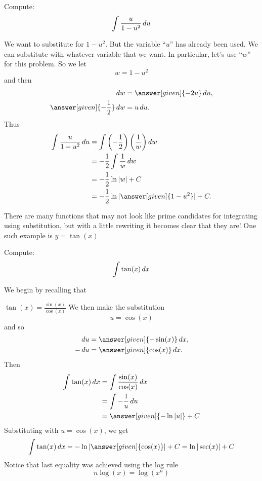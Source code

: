 \documentclass{ximera}
\begin{document}
\begin{example}\label{key example}
Compute:
\[
\int \frac{u}{1-u^2} \mathop{}\!d u
\]
\begin{explanation}
We want to substitute for $1-u^2$.  
But the variable ``$u$'' has already been used. We can substitute with whatever variable that we want.  
In particular, let's use ``$w$'' for this problem.  
So we let
\[
w = 1 - u^2
\]
and then
\begin{align*}
  \d w &= \answer[given]{-2u} \d u,\\
  \answer[given]{-\frac{1}{2}}\d w &=u  \d u .
\end{align*}
Thus
\begin{align*}
\int \frac{u}{1-u^2} \d u &= \int \left(-\frac{1}{2}\right)\left(\frac{1}{w}\right)\d w  \\
&= - \frac{1}{2} \int \frac{1}{w} \d w  \\
&= - \frac{1}{2} \ln|w| + C  \\
&= - \frac{1}{2} \ln|\answer[given]{1-u^2}| + C.
\end{align*}
\end{explanation}


\end{example}

There are many functions that may not look like prime candidates for integrating using substitution, but with a little rewriting it becomes clear that they are! One such example is $y=\tan (x)$

\begin{example}\label{example tan}
Compute:
\[
\int \tan(x) \mathop{}\!d x
\]
\begin{explanation}
We begin by recalling that 

$\tan(x) = \frac{\sin(x)}{\cos(x)}  $
We then make the substitution
\[
u = \cos(x)
\]
and so
\begin{align*}
\d u &= \answer[given]{-\sin(x)} \d x,\\
-\d u &= {\answer[given]{\cos(x)}} \d x.
\end{align*}
Then
\begin{align*}
\int \tan(x) \d x &= \int \frac{\sin(x)}{\cos(x)} \d x  \\
&= \int -\frac{1}{u}  \d u  \\
&= \answer[given]{-\ln|u|}+C
\end{align*}
Substituting with $u=\cos(x)$, we get
\[\int \tan(x) \d x=-\ln|\answer[given]{\cos(x)}|+C=\ln|\sec(x)|+C\]
Notice that last equality was achieved using the log rule
\[n\log(x)=\log(x^n)\]
\end{explanation}
\end{example}
\end{document}
